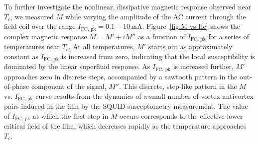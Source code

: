 \documentclass[%
 reprint,
 superscriptaddress,
 amsmath,
 amssymb,
 amsfonts,
 aps,
 prb,
]{revtex4-2}
\newcommand{\Tc}{T_c}
\newcommand{\FC}{\mathrm{FC}}
\newcommand{\pk}{\mathrm{pk}}
\newcommand{\mA}{\mathrm{mA}}
\begin{document}
To further investigate the nonlinear, dissipative magnetic response observed near $\Tc$, we measured $M$ while varying the amplitude of the AC current through the field coil over the range $I_{\FC,\,\pk} = 0.1 - 10\,\mA$. Figure~\ref{fig:M-vs-Ifc} shows the complex magnetic response $M=M'+iM''$ as a function of $I_{\FC,\,\pk}$ for a series of temperatures near $T_c$.  At all temperatures, $M'$ starts out as approximately constant as $I_{\FC,\,\pk}$ is increased from zero, indicating that the local susceptibility is dominated by the linear superfluid response.
As $I_{\FC,\,\pk}$ is increased further, $M'$ approaches zero in discrete steps, accompanied by a sawtooth pattern in the out-of-phase component of the signal, $M''$. This discrete, step-like pattern in the $M$ vs. $I_{\FC,\,\pk}$ curve results from the dynamics of a small number of vortex-antivortex pairs induced in the film by the SQUID susceptometry measurement. The value of $I_{\FC,\,\pk}$ at which the first step in $M$ occurs corresponds to the effective lower critical field of the film, which decreases rapidly as the temperature approaches $T_c$.

\end{document}
